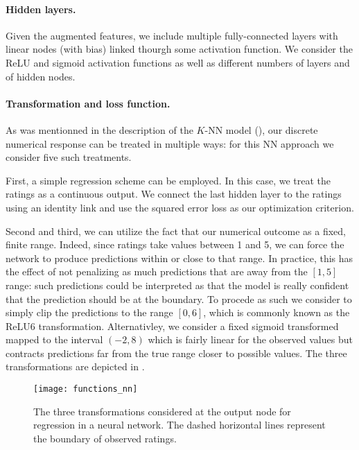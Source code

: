 \documentclass[bj, preprint]{imsart}
\begin{document}
\paragraph{Hidden layers.}\label{par:method.models.nn.hidden}

Given the augmented features, we include multiple fully-connected layers with linear nodes (with bias) linked thourgh some activation function. We consider the ReLU and sigmoid activation functions as well as different numbers of layers and of hidden nodes.

\paragraph{Transformation and loss function.}\label{par:method.models.nn.transform}

As was mentionned in the description of the $K$-NN model (), our discrete numerical response can be treated in multiple ways: for this NN approach we consider five such treatments.

First, a simple regression scheme can be employed. In this case, we treat the ratings as a continuous output. We connect the last hidden layer to the ratings using an identity link and use the squared error loss as our optimization criterion.

Second and third, we can utilize the fact that our numerical outcome as a fixed, finite range. Indeed, since ratings take values between 1 and 5, we can force the network to produce predictions within or close to that range. In practice, this has the effect of not penalizing as much predictions that are away from the $[1,5]$ range: such predictions could be interpreted as that the model is really confident that the prediction should be at the boundary. To procede as such we consider to simply clip the predictions to the range $[0,6]$, which is commonly known as the ReLU6 transformation. Alternativley, we consider a fixed sigmoid transformed mapped to the interval $(-2,8)$ which is fairly linear for the observed values but contracts predictions far from the true range closer to possible values. The three transformations are depicted in .

\begin{figure}[h]
	\centering
	\caption{The three transformations considered at the output node for regression in a neural network. The dashed horizontal lines represent the boundary of observed ratings. \label{fig:method.models.nn.functions}}
	\texttt{[image: functions\_nn]}
\end{figure}
\end{document}
